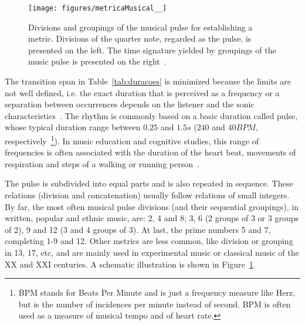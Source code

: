 \begin{figure}
    \centering
        \texttt{[image: figures/metricaMusical\_\_]}
    \caption{Divisions and groupings of the musical pulse for establishing a metric. Divisions of the quarter note, regarded as the
        pulse, is presented on the left. The time signature yielded by
	groupings of the music pulse is presented on the right~\protect\footnotemark.}
        \label{fig:pulsoSubAgl}
\end{figure}


The transition span in Table~\ref{tab:duracoes} is minimized because the limits
are not well defined,
i.e. the exact duration that is perceived as a
frequency or a separation between occurrences depends on the
listener and the sonic characteristics~\cite{microsound,Roederer}.
The rhythm is commonly based on a basic duration called pulse, whose typical duration range between $0.25$ and $1.5s$ ($240$
and $40 BPM$, respectively~\footnote{BPM stands for Beats Per Minute and is just a frequency measure like Herz, but is the number of incidences per minute instead of second. BPM is often used as a measure of musical tempo and of heart rate.}). In music education and cognitive studies, this range of frequencies is often associated with the duration of the heart beat, movements of respiration and steps of a walking or running person~\cite{Lacerda,Roederer}.

The pulse is subdivided into equal parts and is also repeated in sequence. These relations (division and concatenation) usually follow relations of small
integers. By far, the most often musical pulse divisions (and their sequential groupings), in written, popular and ethnic
music, are: 2, 4 and 8; 3, 6 (2 groups of 3 or 3 groups of 2), 9 and 12 (3 and 4 groups of 3). At last, the prime numbers 5 and 7, completing
1-9 and 12. Other metrics are less common, like division or grouping in 13, 17, etc, and are mainly used in experimental music or classical music of the XX and XXI centuries.
A schematic illustration is shown in Figure~\ref{fig:pulsoSubAgl}.~\cite{Gramani,Roederer}

